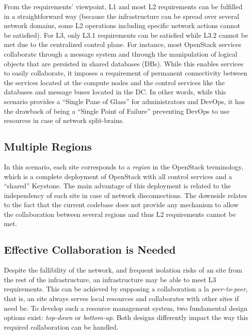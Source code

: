 From the requirements' viewpoint, L1 and most L2 requirements can be
fulfilled in a straightforward way (because the infrastructure can be
spread over several network domains, some L2 operations including
specific network actions cannot be satisfied). For L3, only L3.1
requirements can be satisfied while L3.2 cannot be met due to
the centralized control plane.
For instance, most OpenStack services collaborate through a message system and
through the manipulation of logical objects that are persisted in shared
databases (DBs). While this enables services to easily collaborate, it imposes
a requirement of permanent connectivity between the services located at the
compute nodes and the control services like the databases and message buses
located in the DC.
In other words, while this scenario provides a ``Single Pane of
Glass'' for administrators and DevOps, it has the drawback of being a ``Single
Point of Failure'' preventing DevOps to use \edge resources in case of network
split-brains.

\vspace*{-.2cm}
\subsection{Multiple Regions}
In this scenario, each \edge site corresponds to a \emph{region}
in the OpenStack terminology, which is a complete deployment of
OpenStack with all control services and a ``shared'' Keystone.
The main advantage of this deployment is related to the independency
of each site in case of network disconnections.
The downside relates to the fact that the current codebase does not
provide any mechanism to allow the collaboration between several
regions and thus L2 requirements cannot be met.~


\vspace*{-.1cm}
\subsection{Effective Collaboration is Needed}
Despite the fallibility of the network, and frequent isolation risks
of an \edge site from the rest of the infrastructure, an \edge
infrastructure may be able to meet L3 requirements. This can be
achieved by supposing a collaboration a la \emph{peer-to-peer},
that is, an \edge site always serves local resources and collaborates
with other \edge sites if need be. To develop such a resource
management system, two fundamental design options exist:
\emph{top-down} or \emph{bottom-up}. Both designs differently impact the way
this required collaboration can be handled.

